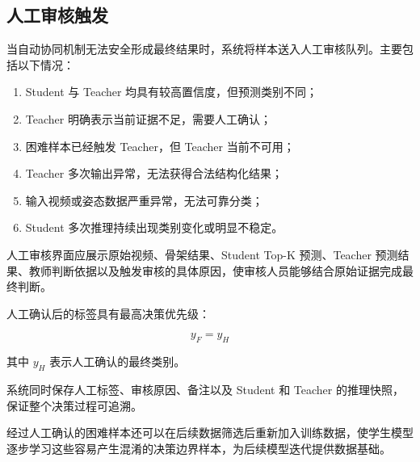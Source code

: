 \subsection{人工审核触发}

当自动协同机制无法安全形成最终结果时，系统将样本送入人工审核队列。主要包括以下情况：

\begin{enumerate}
\item Student 与 Teacher 均具有较高置信度，但预测类别不同；
\item Teacher 明确表示当前证据不足，需要人工确认；
\item 困难样本已经触发 Teacher，但 Teacher 当前不可用；
\item Teacher 多次输出异常，无法获得合法结构化结果；
\item 输入视频或姿态数据严重异常，无法可靠分类；
\item Student 多次推理持续出现类别变化或明显不稳定。
\end{enumerate}

人工审核界面应展示原始视频、骨架结果、Student Top-K 预测、Teacher 预测结果、教师判断依据以及触发审核的具体原因，使审核人员能够结合原始证据完成最终判断。

人工确认后的标签具有最高决策优先级：

\[
y_F=y_H
\]

其中 \(y_H\) 表示人工确认的最终类别。

系统同时保存人工标签、审核原因、备注以及 Student 和 Teacher 的推理快照，保证整个决策过程可追溯。

经过人工确认的困难样本还可以在后续数据筛选后重新加入训练数据，使学生模型逐步学习这些容易产生混淆的决策边界样本，为后续模型迭代提供数据基础。

